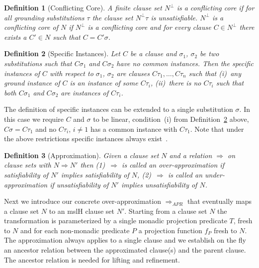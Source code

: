 \documentclass{llncs}
\newcommand{\apr}{ \Rightarrow_{APR}}
\newtheorem{defin}{Definition}
\begin{document}
\begin{defin}[Conflicting Core]\label{conlfictCore}
A finite clause set $N^\bot$ is a conflicting core if for all grounding substitutions $\tau$ the clause set $N^\bot\tau$ is unsatisfiable. 
$N^\bot$ is a conflicting core of $N$ if $N^\bot$ is a conflicting core 
and for every clause $C\in N^\bot$ there exists a $C'\in N$ such that $C=C'\sigma$.
\end{defin}

\begin{defin}[Specific Instances]\label{specInst}
Let $C$ be a clause and $\sigma_1$, $\sigma_2$ be two substitutions
such that $C\sigma_1$ and $C\sigma_2$ have no common instances.
Then the \emph{specific instances} of $C$ with
respect to $\sigma_1$, $\sigma_2$ are clauses $C\tau_1,\ldots,C\tau_n$ such that
(i)~any ground instance of $C$ is an instance of some $C\tau_i$,
(ii)~there is no $C\tau_i$ such that both $C\sigma_1$ and $C\sigma_2$ are 
instances of $C\tau_i$.
\end{defin}

The definition of specific instances can be extended to a single substitution $\sigma$.
In this case we require $C$ and $\sigma$ to be linear,
condition~(i) from Definition~\ref{specInst} above, $C\sigma = C\tau_1$ and no $C\tau_i$, 
$i\neq 1$ has a common instance with $C\tau_1$.
Note that under the above restrictions specific instances always exist~\cite{Lassez:1987:ERT:33031.33036}.

\begin{defin}[Approximation]
Given a clause set $N$ and a relation $\Rightarrow$ on clause sets with $N \Rightarrow N'$ then
(1)~$\Rightarrow$ is called an \emph{over-approximation}  if satisfiability of $N'$ implies satisfiability of $N$,
(2)~$\Rightarrow$ is called an \emph{under-approximation} if unsatisfiability of $N'$ implies unsatisfiability of $N$.
\end{defin}


Next we introduce our concrete over-approximation $\apr$ that 
eventually maps a clause set $N$ to an mslH
clause set $N'$. Starting from a clause set $N$ the transformation is parameterized
by a single monadic projection predicate $T$, fresh to $N$
and for each non-monadic predicate $P$ a projection function $f_P$ fresh to $N$. The approximation
always applies to a single clause and we establish on the fly an ancestor relation between 
the approximated clause(s) and the parent clause. The ancestor relation is needed for lifting and refinement.
\end{document}
